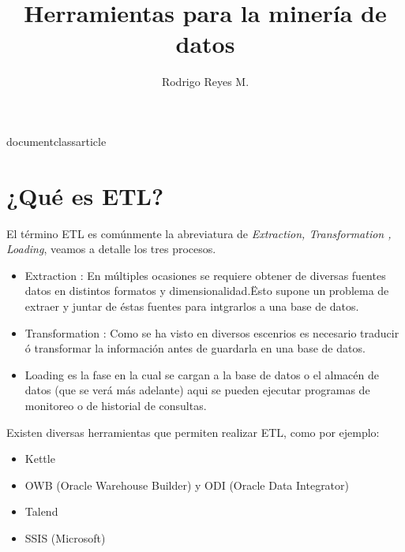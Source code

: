 documentclass{article}
\usepackage[utf8]{inputenc}
\usepackage{graphicx}
\usepackage{hyperref}
\title{Herramientas para la minería de datos}
\author{Rodrigo Reyes M.}
\date{}


\maketitle

\section{¿Qué es ETL?}
El término ETL es comúnmente la abreviatura de \textit{Extraction, Transformation , Loading}, veamos a detalle los tres procesos.
\begin{itemize}
\item Extraction : En múltiples ocasiones se requiere obtener de diversas fuentes datos en distintos formatos y dimensionalidad.Ësto supone un problema de extraer y juntar de éstas fuentes para intgrarlos a una base de datos.
\item Transformation : Como se ha visto en diversos escenrios es necesario traducir ó transformar la información antes de guardarla en una base de datos.
\item Loading es la fase en la cual se cargan a la base de datos o el almacén de datos (que se verá más adelante) aqui se pueden ejecutar programas de monitoreo o de historial de consultas.
\end{itemize}

Existen diversas herramientas que permiten realizar ETL, como por ejemplo:
\begin{itemize}
\item Kettle
\item OWB (Oracle Warehouse Builder) y ODI (Oracle Data Integrator)
\item Talend
\item SSIS (Microsoft)
\end{itemize}
